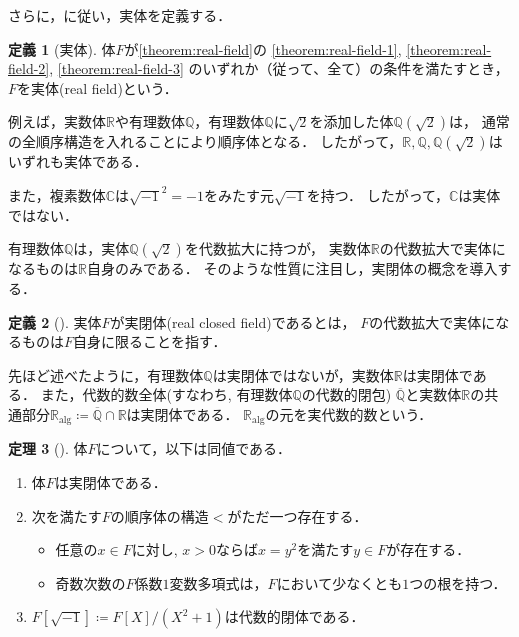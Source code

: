 \documentclass[uplatex, dvipdfmx]{jsarticle}
\numberwithin{equation}{section}
\newcommand{\R}{\mathbb{R}}
\newcommand{\Q}{\mathbb{Q}}
\newcommand{\C}{\mathbb{C}}
\newcommand{\Ralg}{\mathbb{R}_\mathrm{alg}}
\theoremstyle{definition}
\newtheorem{definition}{定義}[section]
\newtheorem{theorem}[definition]{定理}
\begin{document}
さらに，\cite[Definition 1.1.9]{MR1659509}に従い，実体を定義する．

\begin{definition}[実体]
     体$F$が\cref{theorem:real-field}の
     \ref{theorem:real-field-1},
     \ref{theorem:real-field-2},
     \ref{theorem:real-field-3}
     のいずれか（従って、全て）の条件を満たすとき，
     $F$を実体(real field)という．
\end{definition}


例えば，実数体$\R$や有理数体$\Q$，有理数体$\Q$に$\sqrt{2}$を添加した体$\Q\left(\sqrt{2}\right)$は，
通常の全順序構造を入れることにより順序体となる．
したがって，$\R, \Q, \Q\left(\sqrt{2}\right)$はいずれも実体である．

また，複素数体$\C$は$\sqrt{-1}^2 = -1$をみたす元$\sqrt{-1}$を持つ．
したがって，$\C$は実体ではない．

有理数体$\Q$は，実体$\Q\left(\sqrt{2}\right)$を代数拡大に持つが，
実数体$\R$の代数拡大で実体になるものは$\R$自身のみである．
そのような性質に注目し，実閉体の概念を導入する．

\begin{definition}[{\cite[Section I]{MR3069467}}] \label{definition:RCF}
     実体$F$が実閉体(real closed field)であるとは，
     $F$の代数拡大で実体になるものは$F$自身に限ることを指す．
\end{definition}

先ほど述べたように，有理数体$\Q$は実閉体ではないが，実数体$\R$は実閉体である．
また，代数的数全体(すなわち, 有理数体$\Q$の代数的閉包) $\overline{\Q}$と実数体$\R$の共通部分$\Ralg \coloneqq \overline{\Q} \cap \R$は実閉体である．
$\Ralg$の元を実代数的数という．

\begin{theorem}[{\cite[S\"{a}tze 1--3]{MR3069467}}] \label{theorem:real-closed-field}
     体$F$について，以下は同値である．
     \begin{enumerate}
          \item 体$F$は実閉体である．
          \item 次を満たす$F$の順序体の構造$<$がただ一つ存在する．
               \begin{itemize}
                    \item 任意の$x \in F$に対し, $x>0$ならば$x = y^2$を満たす$y \in F$が存在する．
                    \item 奇数次数の$F$係数$1$変数多項式は，$F$において少なくとも$1$つの根を持つ．
               \end{itemize}
          \item $F\left[\sqrt{-1}\right] \coloneqq F[X]/(X^2 + 1)$は代数的閉体である．
     \end{enumerate}
\end{theorem}
\end{document}
